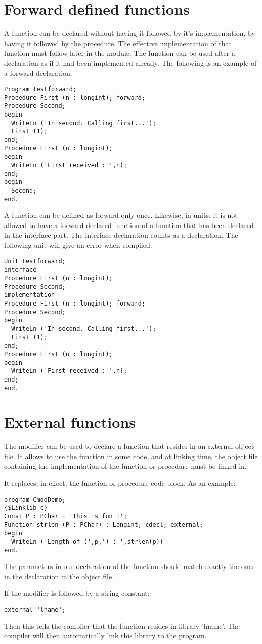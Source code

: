 \section{Forward defined functions}
A function can be declared without having it followed by it's implementation,
by having it followed by the  procedure. The effective
implementation of that function must follow later in the module.
The function can be used after a  declaration as if it had been
implemented already.
The following is an example of a forward declaration.
\begin{verbatim}
Program testforward;
Procedure First (n : longint); forward;
Procedure Second;
begin
  WriteLn ('In second. Calling first...');
  First (1);
end;
Procedure First (n : longint);
begin
  WriteLn ('First received : ',n);
end;
begin
  Second;
end.
\end{verbatim}
A function can be defined as forward only once.
Likewise, in units, it is not allowed to have a forward declared function
of a function that has been declared in the interface part. The interface
declaration counts as a  declaration.
The following unit will give an error when compiled:
\begin{verbatim}
Unit testforward;
interface
Procedure First (n : longint);
Procedure Second;
implementation
Procedure First (n : longint); forward;
Procedure Second;
begin
  WriteLn ('In second. Calling first...');
  First (1);
end;
Procedure First (n : longint);
begin
  WriteLn ('First received : ',n);
end;
end.
\end{verbatim}

\section{External functions}
\label{se:external}
The  modifier can be used to declare a function that resides in
an external object file. It allows to use the function in some code, and at
linking time, the object file containing the implementation of the function
or procedure must be linked in.

It replaces, in effect, the function or procedure code block.
As an example:
\begin{verbatim}
program CmodDemo;
{$Linklib c}
Const P : PChar = 'This is fun !';
Function strlen (P : PChar) : Longint; cdecl; external;
begin
  WriteLn ('Length of (',p,') : ',strlen(p))
end.
\end{verbatim}
\begin{remark}
The parameters in our declaration of the  function
should match exactly the ones in the declaration in the object file.
\end{remark}
If the  modifier is followed by a string constant:
\begin{verbatim}
external 'lname';
\end{verbatim}
Then this tells the compiler that the function resides in library
'lname'. The compiler will then automatically link this library to
the program.

